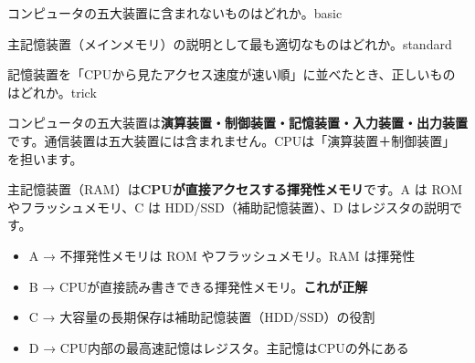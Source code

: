 
\begin{mondai}{コンピュータの五大装置に含まれないものはどれか。}{basic}
\end{mondai}

\begin{mondai}{主記憶装置（メインメモリ）の説明として最も適切なものはどれか。}{standard}
\end{mondai}

\begin{mondai}{記憶装置を「CPUから見たアクセス速度が速い順」に並べたとき、正しいものはどれか。}{trick}
\end{mondai}

\kaitoupage


\begin{kaisetsu}
コンピュータの五大装置は\textbf{演算装置・制御装置・記憶装置・入力装置・出力装置}です。通信装置は五大装置には含まれません。CPUは「演算装置＋制御装置」を担います。
\end{kaisetsu}


\begin{kaisetsu}
主記憶装置（RAM）は\textbf{CPUが直接アクセスする揮発性メモリ}です。A は ROM やフラッシュメモリ、C は HDD/SSD（補助記憶装置）、D はレジスタの説明です。
\end{kaisetsu}

\begin{goutoubun}
\begin{itemize}
  \item A → 不揮発性メモリは ROM やフラッシュメモリ。RAM は揮発性
  \item B → CPUが直接読み書きできる揮発性メモリ。\textbf{これが正解}
  \item C → 大容量の長期保存は補助記憶装置（HDD/SSD）の役割
  \item D → CPU内部の最高速記憶はレジスタ。主記憶はCPUの外にある
\end{itemize}
\end{goutoubun}

